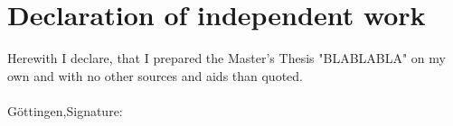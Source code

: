 \chapter*{Declaration of independent work}
\label{declaration}

Herewith I declare, that I prepared the Master's Thesis "BLABLABLA"
on my own and with no other sources and aids than quoted.\\
\\[1.5cm]
Göttingen,\hrulefill\enspace Signature: \hrulefill
\\[3.5cm]





